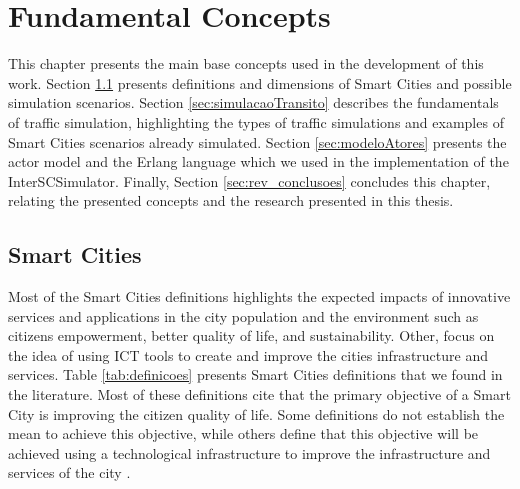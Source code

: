 \chapter{Fundamental Concepts}
\label{cap:conceitos}

This chapter presents the main base concepts used in the development of this work. Section \ref{sec:cidadesInteligentes} presents definitions and dimensions of Smart Cities and possible simulation scenarios. Section \ref{sec:simulacaoTransito} describes the fundamentals of traffic simulation, highlighting the types of traffic simulations and examples of Smart Cities scenarios already simulated. Section \ref{sec:modeloAtores} presents the actor model and the Erlang language which we used in the implementation of the InterSCSimulator. Finally, Section \ref{sec:rev_conclusoes} concludes this chapter, relating the presented concepts and the research presented in this thesis.

\section{Smart Cities}
\label{sec:cidadesInteligentes}

Most of the Smart Cities definitions highlights the expected impacts of innovative services and applications in the city population and the environment such as citizens empowerment, better quality of life, and sustainability. Other, focus on the idea of using ICT tools to create and improve the cities infrastructure and services. Table \ref{tab:definicoes} presents Smart Cities definitions that we found in the literature. Most of these definitions cite that the primary objective of a Smart City is improving the citizen quality of life. Some definitions \citep{giffinger2007smart,guan2012smart} do not establish the mean to achieve this objective, while others define that this objective will be achieved using a technological infrastructure to improve the infrastructure and services of the city \citep{caragliu2011smart,dameri2013searching,harrison2010foundations}.

